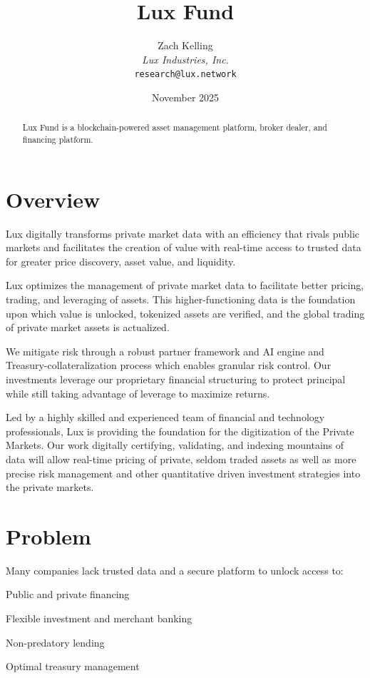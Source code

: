 \documentclass[11pt]{article}
\title{Lux Fund}
\author{Zach Kelling\\\textit{Lux Industries, Inc.}\\\texttt{research@lux.network}}
\date{November 2025}
\begin{document}
\luxcoverpage

\begin{abstract}
Lux Fund is a blockchain-powered asset management platform, broker dealer, and financing platform.
\end{abstract}

\tableofcontents
\newpage


\section{Overview}

Lux digitally transforms private market data with an efficiency that rivals public markets and facilitates the creation of value with real-time access to trusted data for greater price discovery, asset value, and liquidity.


Lux optimizes the management of private market data to facilitate better pricing, trading, and leveraging of assets. This higher-functioning data is the foundation upon which value is unlocked, tokenized assets are verified, and the global trading of private market assets is actualized.


We mitigate risk through a robust partner framework and AI engine and Treasury-collateralization process which enables granular risk control. Our investments leverage our proprietary financial structuring to protect principal while still taking advantage of leverage to maximize returns.


Led by a highly skilled and experienced team of financial and technology professionals, Lux is providing the foundation for the digitization of the Private Markets. Our work digitally certifying, validating, and indexing mountains of data will allow real-time pricing of private, seldom traded assets as well as more precise risk management and other quantitative driven investment strategies into the private markets.


\section{Problem}

Many companies lack trusted data and a secure platform to unlock access to:


Public and private financing


Flexible investment and merchant banking


Non-predatory lending


Optimal treasury management
\end{document}
